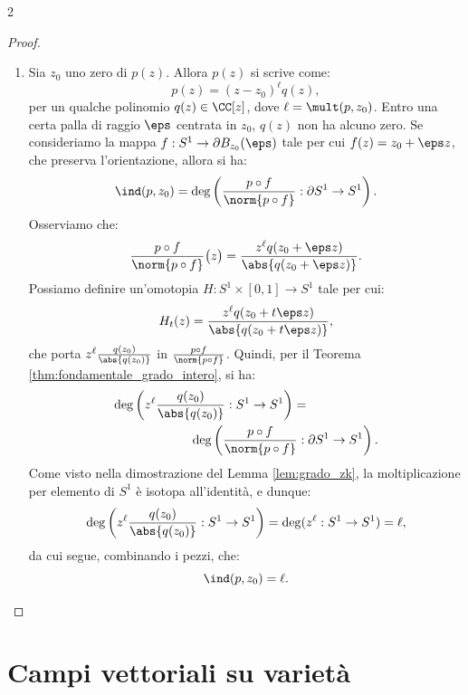 \begin{multicols*}{2}
\begin{proof}
\begin{enumerate}[(1)]
            \item Sia $z_0$ uno zero di $p(z)$. Allora $p(z)$ si scrive come:
                  \[
                      p(z) = (z - z_0)^\ell q(z),
                  \]
                  per un qualche polinomio $q(z) \in \CC[z]$, dove $\ell = \mult(p, z_0)$. Entro
                  una certa palla di raggio $\eps$ centrata in $z_0$, $q(z)$ non ha alcuno zero. Se
                  consideriamo la mappa $f : S^1 \to \partial B_{z_0}(\eps)$ tale per cui
                  $f(z) = z_0 + \eps z$, che preserva l'orientazione, allora si ha:
                  \[
                      \ind(p, z_0) = \deg\left(\frac{p \circ f}{\norm{p \circ f}} : \partial S^1 \to S^1 \right).
                  \]
                  Osserviamo che:
                  \[
                      \frac{p \circ f}{\norm{p \circ f}}\big(z\big) = \frac{z^\ell q(z_0 + \eps z)}{\abs{q(z_0 + \eps z)}}.
                  \]
                  Possiamo definire un'omotopia $H : S^1 \times [0, 1] \to S^1$ tale per cui:
                  \[
                      H_t(z) = \frac{z^\ell q(z_0 + t \eps z)}{\abs{q(z_0 + t \eps z)}},
                  \]
                  che porta $z^\ell \frac{q(z_0)}{\abs{q(z_0)}}$ in $\frac{p \circ f}{\norm{p \circ f}}$. Quindi,
                  per il Teorema \ref{thm:fondamentale_grado_intero}, si ha:
                  \[
                      \begin{split}
                          \deg\left(z^\ell \frac{q(z_0)}{\abs{q(z_0)}} : S^1 \to S^1\right) = \hspace{2cm} \\
                          \hspace{2cm} \deg\left(\frac{p \circ f}{\norm{p \circ f}} : \partial S^1 \to S^1 \right).
                      \end{split}
                  \]
                  Come visto nella dimostrazione del Lemma \ref{lem:grado_zk}, la moltiplicazione per elemento di $S^1$ è isotopa all'identità, e dunque:
                  \[
                      \deg\left(z^\ell \frac{q(z_0)}{\abs{q(z_0)}} : S^1 \to S^1\right) = \deg(z^\ell : S^1 \to S^1) = \ell,
                  \]
                  da cui segue, combinando i pezzi, che:
                  \[
                      \ind(p, z_0) = \ell.
                  \]
        \end{enumerate}
    \end{proof}

    \section{Campi vettoriali su varietà}


\end{multicols*}
